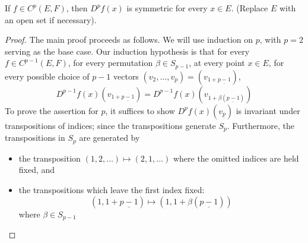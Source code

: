 \documentclass[../main-v2-manifolds.tex]{subfiles}
\begin{document}
\begin{wts}
    If $f\in C^p(E,F)$, then $D^pf(x)$ is symmetric for every $x\in E$. (Replace $E$ with an open set if necessary).
\end{wts}
\begin{proof}
    The main proof proceeds as follows. We will use induction on $p$, with $p=2$ serving as the base case. Our induction hypothesis is that for every $f\in C^{p-1}(E,F)$, for every permutation $\beta\in S_{p-1}$, at every point $x\in E$, for every possible choice of $p-1$ vectors $(v_2,\ldots, v_{p}) = (v_{1 + \underline{p-1}})$,
    \[
        D^{p-1}f(x)(v_{1+\underline{p-1}}) = D^{p-1}f(x)(v_{1+\beta(\underline{p-1})})
    \]
    To prove the assertion for $p$, it suffices to show $D^pf(x)(v_{\underline{p}})$ is invariant under transpositions of indices; since the transpositions generate $S_p$. Furthermore, the transpositions in $S_p$ are generated by 
    
    \begin{itemize}
        \item the transposition $(1,2,\ldots)\mapsto (2,1,\ldots)$ where the omitted indices are held fixed, and
        \item the transpositions which leave the first index fixed:
        \[
            (1,1+\underline{p-1})\mapsto (1,1+\beta({\underline{p-1}}))
        \]
        where $\beta\in S_{p-1}$
    \end{itemize}


\end{proof}
\end{document}
